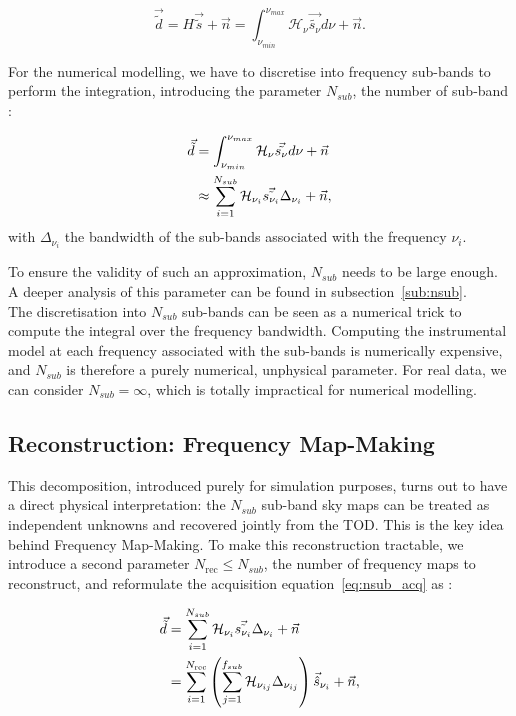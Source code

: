 \documentclass[../../thesis.tex]{subfiles}
\begin{document}
\begin{equation}
    \vec{\tilde{d}} = H\vec{\tilde{s}} + \vec{n} = \int_{\nu_{min}}^{\nu_{max}}\mathcal{H}_\nu\vec{\tilde{s_\nu}}d\nu + \vec{n}.
\end{equation}

For the numerical modelling, we have to discretise into frequency sub-bands to perform the integration, introducing the parameter $N_{sub}$, the number of sub-band : 

\begin{align} \label{eq:nsub_acq}
    \vec{\tilde{d}} &= \int_{\nu_{min}}^{\nu_{max}}\mathcal{H}_\nu\vec{\tilde{s_\nu}}d\nu + \vec{n} \notag \\
    & \approx \sum_{i = 1}^{N_{sub}} \mathcal{H}_{\nu_i} \vec{\tilde{s_{\nu_i}}}\Delta_{\nu_i} + \vec{n},
\end{align}
with $\Delta_{\nu_i}$ the bandwidth of the sub-bands associated with the frequency $\nu_i$.

To ensure the validity of such an approximation, $N_{sub}$ needs to be large enough. A deeper analysis of this parameter can be found in subsection~\ref{sub:nsub}.  \\
The discretisation into $N_{sub}$ sub-bands can be seen as a numerical trick to compute the integral over the frequency bandwidth. Computing the instrumental model at each frequency associated with the sub-bands is numerically expensive, and $N_{sub}$ is therefore a purely numerical, unphysical parameter. For real data, we can consider $N_{sub} = \infty$, which is totally impractical for numerical modelling.

\subsection{Reconstruction: Frequency Map-Making}

This decomposition, introduced purely for simulation purposes, turns out to have a direct physical interpretation: the $N_{sub}$ sub-band sky maps can be treated as independent unknowns and recovered jointly from the TOD. This is the key idea behind Frequency Map-Making. To make this reconstruction tractable, we introduce a second parameter $N_\text{rec} \leq N_{sub}$, the number of frequency maps to reconstruct, and reformulate the acquisition equation~\ref{eq:nsub_acq} as :

\begin{align}
    \vec{\tilde{d}} &= \sum_{i = 1}^{N_{sub}} \mathcal{H}_{\nu_i} \vec{\tilde{s_{\nu_i}}}\Delta_{\nu_i} + \vec{n} \notag \\
    &= \sum_{i = 1}^{N_\text{rec}} \left( \sum_{j = 1}^{f_{sub}} \mathcal{H}_{\nu_{ij}}  \Delta_{\nu_{ij}} \right) \vec{\hat{s}}_{\nu_{i}} + \vec{n},
\end{align}
\end{document}
